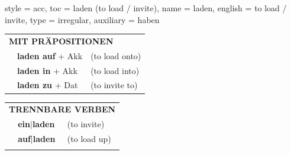\begin{verbentry}{
  style = {acc},
  toc = {laden (to load / invite)},
  name = {laden},
  english = {to load / invite},
  type = {irregular},
  auxiliary = {haben}
}
 \vspace{10pt}

\begin{tabular}{lll}
      \multicolumn{3}{l}{\textbf{MIT PRÄPOSITIONEN}}\\
& \textbf{laden auf} + Akk & (to load onto)\\
& \textbf{laden in} + Akk & (to load into)\\
& \textbf{laden zu} + Dat & (to invite to)\\
\end{tabular}
  \hfill
\begin{tabular}{lll}
      \multicolumn{3}{l}{\textbf{TRENNBARE VERBEN}}\\
 & \textbf{ein$|$laden} & (to invite)\\
 & \textbf{auf$|$laden} & (to load up)\\
\vspace{10pt}
  \end{tabular}
  
  \vspace{-5pt}
\end{verbentry}

